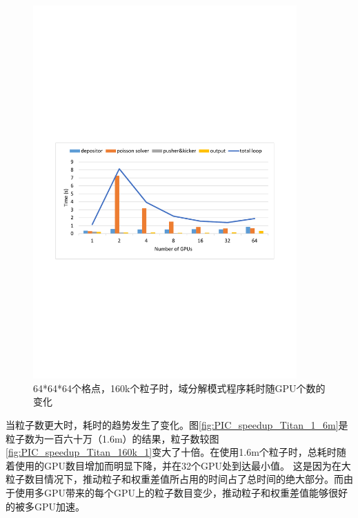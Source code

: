 \begin{figure}[!htb]
  \centering
  \includegraphics[width=0.9\textwidth]{Img/PIC_speedup_Titan_160k_2.pdf}
  \caption{64*64*64个格点，160k个粒子时，域分解模式程序耗时随GPU个数的变化}
  \label{fig:PIC_speedup_Titan_160k_2}
\end{figure}

当粒子数更大时，耗时的趋势发生了变化。图\ref{fig:PIC_speedup_Titan_1_6m}是粒子数为一百六十万（1.6m）的结果，粒子数较图\ref{fig:PIC_speedup_Titan_160k_1}变大了十倍。在使用1.6m个粒子时，总耗时随着使用的GPU数目增加而明显下降，并在32个GPU处到达最小值。
这是因为在大粒子数目情况下，推动粒子和权重差值所占用的时间占了总时间的绝大部分。而由于使用多GPU带来的每个GPU上的粒子数目变少，推动粒子和权重差值能够很好的被多GPU加速。

